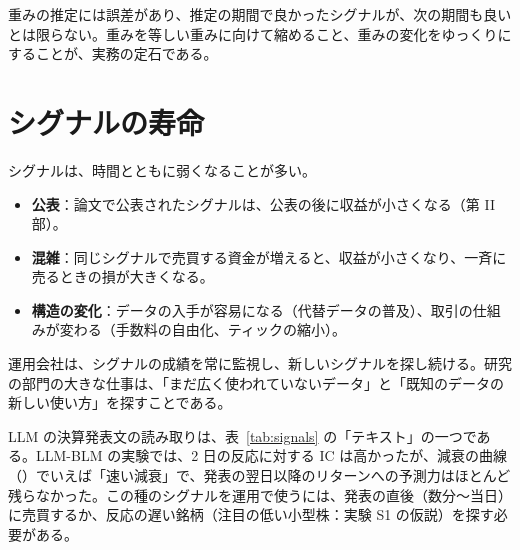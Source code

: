 重みの推定には誤差があり、推定の期間で良かったシグナルが、次の期間も良いとは限らない。重みを等しい重みに向けて縮めること、重みの変化をゆっくりにすることが、実務の定石である。

\section{シグナルの寿命}

シグナルは、時間とともに弱くなることが多い。

\begin{itemize}
\item \textbf{公表}：論文で公表されたシグナルは、公表の後に収益が小さくなる（第 II 部）。
\item \textbf{混雑}：同じシグナルで売買する資金が増えると、収益が小さくなり、一斉に売るときの損が大きくなる。
\item \textbf{構造の変化}：データの入手が容易になる（代替データの普及）、取引の仕組みが変わる（手数料の自由化、ティックの縮小）。
\end{itemize}

運用会社は、シグナルの成績を常に監視し、新しいシグナルを探し続ける。研究の部門の大きな仕事は、「まだ広く使われていないデータ」と「既知のデータの新しい使い方」を探すことである。

\begin{projbox}
LLM の決算発表文の読み取りは、表~\ref{tab:signals} の「テキスト」の一つである。LLM-BLM の実験では、2 日の反応に対する IC は高かったが、減衰の曲線（）でいえば「速い減衰」で、発表の翌日以降のリターンへの予測力はほとんど残らなかった。この種のシグナルを運用で使うには、発表の直後（数分〜当日）に売買するか、反応の遅い銘柄（注目の低い小型株：実験 S1 の仮説）を探す必要がある。
\end{projbox}
